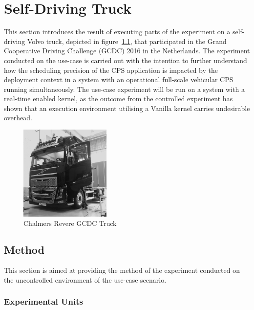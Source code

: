 \chapter{Self-Driving Truck}\label{section:data-validation}

This section introduces the result of executing parts of the experiment on a self-driving Volvo truck, depicted in figure~\ref{truck}, that participated in the Grand Cooperative Driving Challenge (GCDC) 2016 in the Netherlands. The experiment conducted on the use-case is carried out with the intention to further understand how the scheduling precision of the CPS application is impacted by the deployment context in a system with an operational full-scale vehicular CPS running simultaneously. The use-case experiment will be run on a system with a real-time enabled kernel, as the outcome from the controlled experiment has shown that an execution environment utilising a Vanilla kernel carries undesirable overhead.\\

\begin{figure}[ht]
\centering
\caption{Chalmers Revere GCDC Truck}
\label{truck}
\includegraphics[width=0.4\textwidth]{./figure/truck.png}
\end{figure}


\section{Method}
\label{sec:truck-method}

This section is aimed at providing the method of the experiment conducted on the uncontrolled environment of the use-case scenario.


\subsection{Experimental Units}
\label{sec:truck-expun}

